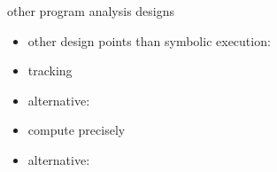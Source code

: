 \begin{frame}{other program analysis designs}
    \begin{itemize}
    \item other design points than symbolic execution:
    \vspace{.5cm}
    \item tracking 
    \item alternative: 
    \vspace{.5cm}
    \item compute precisely 
    \item alternative: 
    \end{itemize}
\end{frame}

